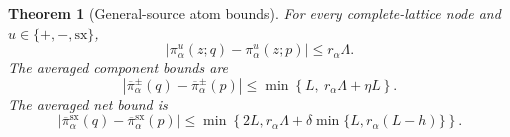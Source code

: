 \documentclass[11pt]{article}
\newtheorem{theorem}{Theorem}[section]
\theoremstyle{definition}
\newcommand{\sx}{\mathrm{sx}}
\begin{document}
\begin{theorem}[General-source atom bounds]\label{thm:general-atom}
For every complete-lattice node and $u\in\{+,-,\sx\}$,
\begin{equation}\label{eq:pointwise-moduli}
  |\pi_\alpha^u(z;q)-\pi_\alpha^u(z;p)|
  \le r_\alpha\Lambda.
\end{equation}
The averaged component bounds are
\begin{equation}\label{eq:averaged-component}
  \left|
    \overline{\pi}_\alpha^\pm(q)-\overline{\pi}_\alpha^\pm(p)
  \right|
  \le
  \min\left\{L,\ r_\alpha\Lambda+\eta L\right\}.
\end{equation}
The averaged net bound is
\begin{equation}\label{eq:averaged-net}
  \left|
    \overline{\pi}_\alpha^\sx(q)-\overline{\pi}_\alpha^\sx(p)
  \right|
  \le
  \min\left\{
    2L,
    r_\alpha\Lambda+\delta\min\{L,r_\alpha(L-h)\}
  \right\}.
\end{equation}
\end{theorem}
\end{document}
